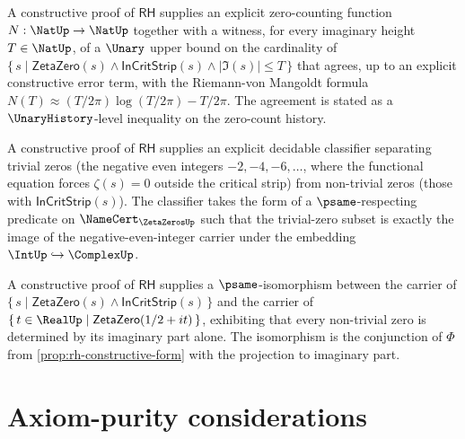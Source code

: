 \begin{theorem}
\label{thm:rh-witness-zero-count}
A constructive proof of $\mathsf{RH}$ supplies an explicit zero-counting function $N : \NatUp \to \NatUp$ together with a witness, for every imaginary height $T \in \NatUp$, of a $\Unary$ upper bound on the cardinality of $\{\, s \mid \mathsf{ZetaZero}(s) \wedge \mathsf{InCritStrip}(s) \wedge |\Im(s)| \le T \,\}$ that agrees, up to an explicit constructive error term, with the Riemann-von Mangoldt formula $N(T) \approx (T / 2\pi) \log(T / 2\pi) - T / 2\pi$. The agreement is stated as a $\UnaryHistory$-level inequality on the zero-count history.
\end{theorem}

\begin{theorem}
\label{thm:rh-witness-trivial-zero}
A constructive proof of $\mathsf{RH}$ supplies an explicit decidable classifier separating trivial zeros (the negative even integers $-2, -4, -6, \dots$, where the functional equation forces $\zeta(s) = 0$ outside the critical strip) from non-trivial zeros (those with $\mathsf{InCritStrip}(s)$). The classifier takes the form of a $\psame$-respecting predicate on $\NameCert_{\ZetaZerosUp}$ such that the trivial-zero subset is exactly the image of the negative-even-integer carrier under the embedding $\IntUp \hookrightarrow \ComplexUp$.
\end{theorem}

\begin{theorem}
\label{thm:rh-witness-critical-line-restriction}
A constructive proof of $\mathsf{RH}$ supplies a $\psame$-isomorphism between the carrier of $\{\, s \mid \mathsf{ZetaZero}(s) \wedge \mathsf{InCritStrip}(s) \,\}$ and the carrier of $\{\, t \in \RealUp \mid \mathsf{ZetaZero}(1/2 + it) \,\}$, exhibiting that every non-trivial zero is determined by its imaginary part alone. The isomorphism is the conjunction of $\Phi$ from \autoref{prop:rh-constructive-form} with the projection to imaginary part.
\end{theorem}

\section{Axiom-purity considerations}
\label{sec:rh-axiom-purity}

